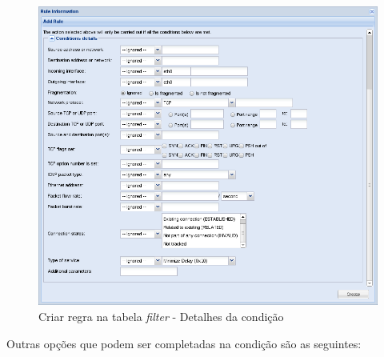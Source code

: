 \begin{figure}[H]
    \begin{center}
    \includegraphics[scale=0.38]{screenshots/etfw/etfw_firewall_03.png}
    \caption{Criar regra na tabela \textit{filter} - Detalhes da condição}
    \label{fig:etfw_firewall_03}
    \end{center}
\end{figure}

Outras opções que podem ser completadas na condição são as seguintes:

